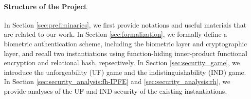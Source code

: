 \paragraph{Structure of the Project}
In Section \ref{sec:preliminaries}, we first provide notations and useful materials that are related to our work.
In Section \ref{sec:formalization}, we formally define a biometric authentication scheme, including the biometric layer and cryptographic layer, and recall two instantiations using function-hiding inner-product functional encryption and relational hash, repsectively.
In Section \ref{sec:security_game}, we introduce the unforgeability (UF) game and the indistinguishability (IND) game. 
In Section \ref{sec:security_analysis:fh-IPFE} and \ref{sec:security_analysis:rh}, we provide analyses of the UF and IND security of the existing instantiations.
